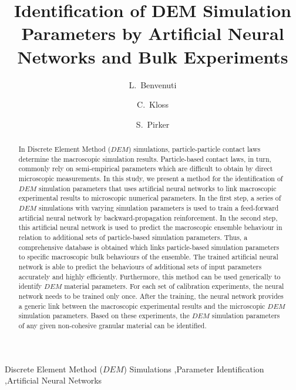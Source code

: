 \documentclass[review]{elsarticle}
\begin{document}
\begin{frontmatter}

\title{Identification of DEM Simulation Parameters by Artificial Neural Networks
and Bulk Experiments}

\author[jku]{L.~Benvenuti}

\author[dcs]{C.~Kloss}

\author[jku]{S.~Pirker}


\address[jku]{Johannes Kepler University Linz, Department on Particulate Flow
Modelling, Altenbergerstrasse 69, 4040, Linz, Austria}

\address[dcs]{DCS Computing GmbH, Altenbergerstr. 66a - Science Park, 4040 Linz,
Austria}

\begin{abstract}
In Discrete Element Method ($DEM$) simulations, particle-particle contact laws
determine the macroscopic simulation results. Particle-based contact laws, in
turn, commonly rely on semi-empirical parameters which are difficult to obtain
by direct microscopic measurements.
In this study, we present a method for the identification of
$DEM$ simulation parameters 
that uses artificial neural networks to link
macroscopic experimental results to
microscopic numerical parameters.
In the first step, a series
of $DEM$ simulations with varying simulation parameters is used to train a
feed-forward artificial neural network by backward-propagation reinforcement. 
In the second step, this artificial neural network is used to predict the
macroscopic ensemble behaviour in relation to additional sets of particle-based
simulation parameters.
Thus, a comprehensive database is obtained
which links particle-based simulation parameters to specific macroscopic
bulk behaviours of the ensemble.
The trained artificial neural network is able to predict the behaviours of
additional sets of input parameters accurately and highly efficiently.
Furthermore, this method can be used generically to
identify $DEM$ material parameters.
For each set of calibration experiments, the neural network 
needs to be trained only once.
After the training, the neural network provides a generic link between the macroscopic 
experimental results and the microscopic $DEM$ simulation parameters.
Based on these experiments, the $DEM$ simulation parameters of any given
non-cohesive granular material can be identified.

\end{abstract}

\begin{keyword}
Discrete Element Method ($DEM$) Simulations \sep Parameter Identification \sep Artificial Neural Networks
\end{keyword}
\end{frontmatter}
\end{document}
